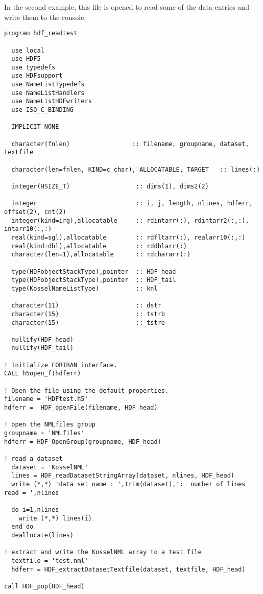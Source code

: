\documentclass[DIV=calc, paper=letter, fontsize=11pt]{scrartcl}	 %
\begin{document}
In the second example, this file is opened to read some of the data entries and write them to the console.
{\small\begin{verbatim}
program hdf_readtest

  use local
  use HDF5
  use typedefs
  use HDFsupport
  use NameListTypedefs
  use NameListHandlers
  use NameListHDFwriters
  use ISO_C_BINDING
  
  IMPLICIT NONE

  character(fnlen)                 :: filename, groupname, dataset, textfile
  
  character(len=fnlen, KIND=c_char), ALLOCATABLE, TARGET   :: lines(:) 

  integer(HSIZE_T)                  :: dims(1), dims2(2)

  integer                           :: i, j, length, nlines, hdferr, offset(2), cnt(2)
  integer(kind=irg),allocatable     :: rdintarr(:), rdintarr2(:,:), intarr10(:,:)
  real(kind=sgl),allocatable        :: rdfltarr(:), realarr10(:,:)
  real(kind=dbl),allocatable        :: rddblarr(:)
  character(len=1),allocatable      :: rdchararr(:)

  type(HDFobjectStackType),pointer  :: HDF_head
  type(HDFobjectStackType),pointer  :: HDF_tail
  type(KosselNameListType)          :: knl

  character(11)                     :: dstr
  character(15)                     :: tstrb
  character(15)                     :: tstre

  nullify(HDF_head)
  nullify(HDF_tail)

! Initialize FORTRAN interface.
CALL h5open_f(hdferr)

! Open the file using the default properties.
filename = 'HDFtest.h5'
hdferr =  HDF_openFile(filename, HDF_head)

! open the NMLfiles group
groupname = 'NMLfiles'
hdferr = HDF_OpenGroup(groupname, HDF_head)

! read a dataset
  dataset = 'KosselNML'
  lines = HDF_readDatasetStringArray(dataset, nlines, HDF_head) 
  write (*,*) 'data set name : ',trim(dataset),':  number of lines read = ',nlines

  do i=1,nlines
    write (*,*) lines(i)
  end do
  deallocate(lines)

! extract and write the KosselNML array to a test file 
  textfile = 'test.nml'
  hdferr = HDF_extractDatasetTextfile(dataset, textfile, HDF_head)

call HDF_pop(HDF_head)


\end{verbatim}}
\end{document}
